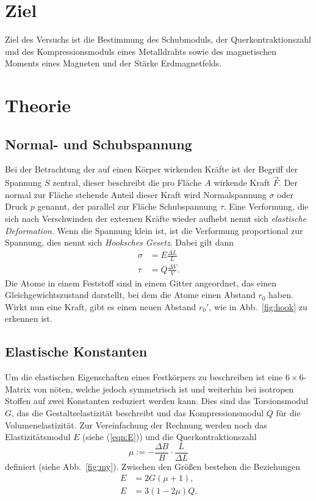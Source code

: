 \section{Ziel}
\label{sec:Ziel}
Ziel des Versuchs ist die Bestimmung des Schubmoduls, der Querkontraktionszahl und des Kompressionsmoduls eines Metalldrahts sowie des magnetischen Moments eines Magneten und der Stärke Erdmagnetfelds.


\section{Theorie}
\label{sec:theorie}
\subsection{Normal- und Schubspannung}
Bei der Betrachtung der auf einen Körper wirkenden Kräfte ist der Begriff der Spannung $S$ zentral, dieser beschreibt die pro Fläche $A$ wirkende Kraft $\vec{F}$. Der normal zur Fläche stehende Anteil dieser Kraft wird Normalspannung $\sigma$ oder Druck $p$ genannt, der parallel zur Fläche Schubspannung $\tau$. Eine Verformung, die sich nach Verschwinden der externen Kräfte wieder aufhebt nennt sich \emph{elastische Deformation}. Wenn die Spannung klein ist, ist die Verformung proportional zur Spannung, dies nennt sich \emph{Hooksches Gesetz}. Dabei gilt dann
\begin{align}
  \sigma &= E \frac{\Delta L}{L} \label{eqn:E} \\
  \tau &= Q \frac{\Delta V}{V}.
\end{align}
Die Atome in einem Feststoff sind in einem Gitter angeordnet, das einen Gleichgewichtszustand darstellt, bei dem die Atome einen Abstand $r_0$ haben. Wirkt nun eine Kraft, gibt es einen neuen Abstand $r_0'$, wie in Abb.~\ref{fig:hook} zu erkennen ist.


\subsection{Elastische Konstanten}
Um die elastischen Eigenschaften eines Festkörpers zu beschreiben ist eine $6 \times 6$-Matrix von nöten, welche jedoch symmetrisch ist und weiterhin bei isotropen Stoffen auf zwei Konstanten reduziert werden kann. Dies sind das Torsionsmodul $G$, das die Gestaltselastizität beschreibt und das Kompressionsmodul $Q$ für die Volumenelastizität. Zur Vereinfachung der Rechnung werden noch das Elastizitätsmodul $E$ (siehe (\ref{eqn:E})) und die Querkontraktionszahl
\begin{equation}
  \mu := -\frac{\Delta B}{B} \cdot \frac{L}{\Delta L}
\end{equation}
definiert (siehe Abb.~\ref{fig:my}). Zwischen den Größen bestehen die Beziehungen
\begin{align}
  E &= 2G (\mu + 1 ),\\
  E &= 3(1-2\mu)Q.
\end{align}

